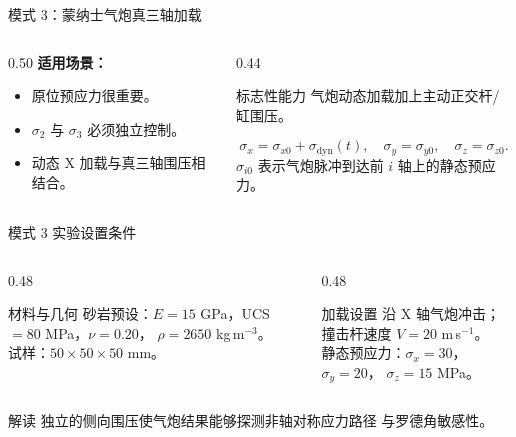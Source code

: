\documentclass[11pt,aspectratio=169]{beamer}
\newcommand{\cncue}[1]{{\footnotesize\color{TUSTmidgray} #1}}
\begin{document}
\begin{frame}{模式 3：蒙纳士气炮真三轴加载}
  \begin{columns}[T,onlytextwidth]
    \begin{column}{0.50\textwidth}
      \textbf{适用场景：}
      \begin{itemize}
        \item 原位预应力很重要。
        \item $\sigma_2$ 与 $\sigma_3$ 必须独立控制。
        \item 动态 X 加载与真三轴围压相结合。
      \end{itemize}
    \end{column}
    \begin{column}{0.44\textwidth}
      \begin{exampleblock}{标志性能力}
        气炮动态加载加上主动正交杆/缸围压。
      \end{exampleblock}
      \[
        \sigma_x=\sigma_{x0}+\sigma_{\mathrm{dyn}}(t), \quad
        \sigma_y=\sigma_{y0}, \quad \sigma_z=\sigma_{z0}.
      \]
      \cncue{$\sigma_{i0}$ 表示气炮脉冲到达前 $i$ 轴上的静态预应力。}
    \end{column}
  \end{columns}
\end{frame}

\begin{frame}{模式 3 实验设置条件}
  \small
  \begin{columns}[T,onlytextwidth]
    \begin{column}{0.48\textwidth}
      \begin{block}{材料与几何}
        砂岩预设：$E=15$ GPa，UCS $=80$ MPa，$\nu=0.20$，
        $\rho=2650$ kg\,m$^{-3}$。\\[3pt]
        试样：$50\times50\times50$ mm。
      \end{block}
    \end{column}
    \begin{column}{0.48\textwidth}
      \begin{exampleblock}{加载设置}
        沿 X 轴气炮冲击；撞击杆速度 $V=20$ m\,s$^{-1}$。\\[3pt]
        静态预应力：$\sigma_x=30$，$\sigma_y=20$，
        $\sigma_z=15$ MPa。
      \end{exampleblock}
    \end{column}
  \end{columns}
  \vspace{0.2cm}
  \begin{block}{解读}
    独立的侧向围压使气炮结果能够探测非轴对称应力路径
    与罗德角敏感性。
  \end{block}
\end{frame}
\end{document}
